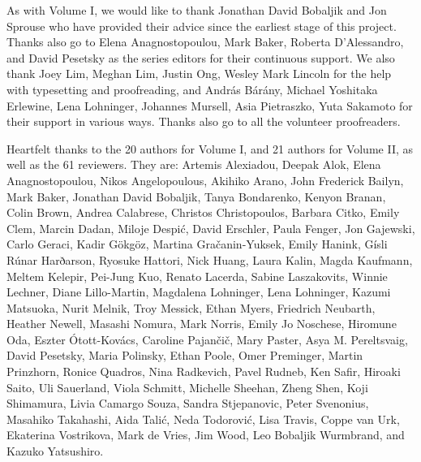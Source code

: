 \begin{refsection}


As with Volume I, we would like to thank Jonathan David Bobaljik and Jon Sprouse who have provided their advice since the earliest stage of this project. 
Thanks also go to Elena Anagnostopoulou, Mark Baker, Roberta D'Alessandro, and David Pesetsky as the series editors for their continuous support. 
We also thank Joey Lim, Meghan Lim, Justin Ong, Wesley Mark Lincoln for the help with typesetting and proofreading, and András Bárány, Michael Yoshitaka Erlewine, Lena Lohninger, Johannes Mursell, Asia Pietraszko, Yuta Sakamoto for their support in various ways. Thanks also go to all the volunteer proofreaders. 

\begin{sloppypar}
Heartfelt thanks to the 20 authors for Volume I, and 21 authors for Volume II, as well as the 61 reviewers. They are: 
Artemis Alexiadou, 
Deepak Alok, 
Elena Anagnostopoulou, 
Nikos Angelopoulous, 
Akihiko Arano, 
John Frederick Bailyn, 
Mark Baker, 
Jonathan David Bobaljik, 
Tanya Bondarenko, 
Kenyon Branan, 
Colin Brown, 
Andrea Calabrese, 
Christos Christopoulos, 
Barbara Citko, 
Emily Clem, 
Marcin Dadan, 
Miloje Despić, 
David Erschler, 
Paula Fenger, 
Jon Gajewski, 
Carlo Geraci, 
Kadir Gökgöz, 
Martina Gračanin-Yuksek, 
Emily Hanink, 
Gísli Rúnar Harðarson, 
Ryosuke Hattori, 
Nick Huang, 
Laura Kalin, 
Magda Kaufmann, 
Meltem Kelepir, 
Pei-Jung Kuo, 
Renato Lacerda, 
Sabine Laszakovits, 
Winnie Lechner, 
Diane Lillo-Martin, 
Magdalena Lohninger, 
Lena Lohninger, 
Kazumi Matsuoka, 
Nurit Melnik, 
Troy Messick, 
Ethan Myers, 
Friedrich Neubarth, 
Heather Newell, 
Masashi Nomura, 
Mark Norris, 
Emily Jo Noschese, 
Hiromune Oda, 
Eszter Ótott-Kovács, 
Caroline Pajančič, 
Mary Paster, 
Asya M. Pereltsvaig, 
David Pesetsky, 
Maria Polinsky, 
Ethan Poole, 
Omer Preminger, 
Martin Prinzhorn, 
Ronice Quadros, 
Nina Radkevich, 
Pavel Rudneb, 
Ken Safir, 
Hiroaki Saito, 
Uli Sauerland, 
Viola Schmitt, 
Michelle Sheehan, 
Zheng Shen, 
Koji Shimamura, 
Livia Camargo Souza, 
Sandra Stjepanovic, 
Peter Svenonius, 
Masahiko Takahashi, 
Aida Talić, 
Neda Todorović, 
Lisa Travis, 
Coppe van Urk, 
Ekaterina Vostrikova, 
Mark de Vries, 
Jim Wood, 
Leo Bobaljik Wurmbrand, and 
Kazuko Yatsushiro.
\end{sloppypar}



\end{refsection}
